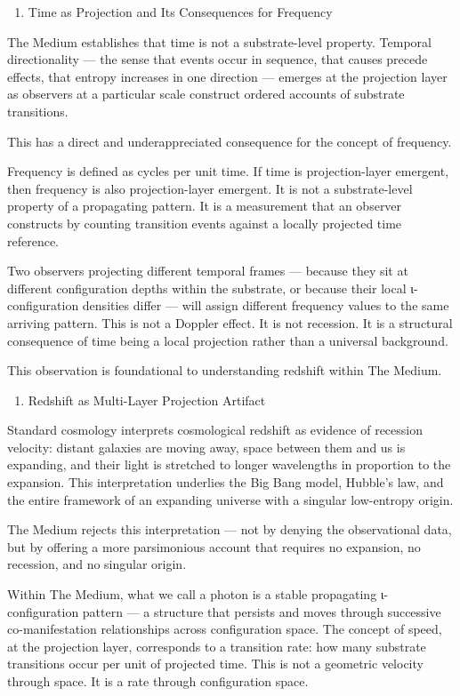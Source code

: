 \documentclass[11pt,letterpaper]{article}
\begin{document}
\begin{enumerate}
\item Time as Projection and Its Consequences for Frequency
\end{enumerate}

The Medium establishes that time is not a substrate-level property. Temporal directionality — the sense that events occur in sequence, that causes precede effects, that entropy increases in one direction — emerges at the projection layer as observers at a particular scale construct ordered accounts of substrate transitions.

This has a direct and underappreciated consequence for the concept of frequency.

Frequency is defined as cycles per unit time. If time is projection-layer emergent, then frequency is also projection-layer emergent. It is not a substrate-level property of a propagating pattern. It is a measurement that an observer constructs by counting transition events against a locally projected time reference.

Two observers projecting different temporal frames — because they sit at different configuration depths within the substrate, or because their local ι-configuration densities differ — will assign different frequency values to the same arriving pattern. This is not a Doppler effect. It is not recession. It is a structural consequence of time being a local projection rather than a universal background.

This observation is foundational to understanding redshift within The Medium.


\begin{enumerate}
\item Redshift as Multi-Layer Projection Artifact
\end{enumerate}

Standard cosmology interprets cosmological redshift as evidence of recession velocity: distant galaxies are moving away, space between them and us is expanding, and their light is stretched to longer wavelengths in proportion to the expansion. This interpretation underlies the Big Bang model, Hubble's law, and the entire framework of an expanding universe with a singular low-entropy origin.

The Medium rejects this interpretation — not by denying the observational data, but by offering a more parsimonious account that requires no expansion, no recession, and no singular origin.

Within The Medium, what we call a photon is a stable propagating ι-configuration pattern — a structure that persists and moves through successive co-manifestation relationships across configuration space. The concept of speed, at the projection layer, corresponds to a transition rate: how many substrate transitions occur per unit of projected time. This is not a geometric velocity through space. It is a rate through configuration space.
\end{document}

